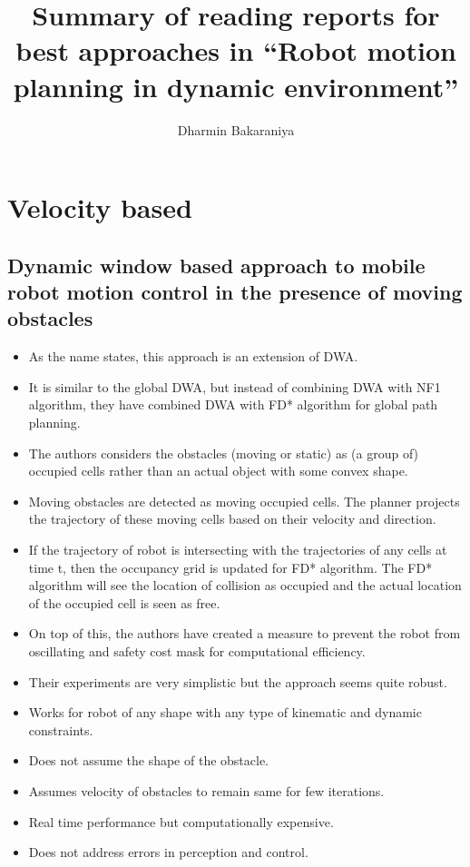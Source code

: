 \documentclass[11pt]{article}
\title{Summary of reading reports for best approaches in ``Robot motion planning in dynamic environment''}
\author{Dharmin Bakaraniya}
\begin{document}
\maketitle{}

\section{Velocity based}
\subsection{Dynamic window based approach to mobile robot motion control in the presence of moving obstacles\cite{seder2007dynamic}}
\begin{itemize}
    \item As the name states, this approach is an extension of DWA\cite{fox1997dynamic}.
    \item It is similar to the global DWA\cite{brock1999high}, but instead of combining DWA with NF1 algorithm, they have combined DWA with FD* algorithm\cite{stentz1995focused} for global path planning.
    \item The authors considers the obstacles (moving or static) as (a group of) occupied cells rather than an actual object with some convex shape.
    \item Moving obstacles are detected as moving occupied cells. The planner projects the trajectory of these moving cells based on their velocity and direction.
    \item If the trajectory of robot is intersecting with the trajectories of any cells at time t, then the occupancy grid is updated for FD* algorithm. The FD* algorithm will see the location of collision as occupied and the actual location of the occupied cell is seen as free.
    \item On top of this, the authors have created a measure to prevent the robot from oscillating and safety cost mask for computational efficiency.
    \item Their experiments are very simplistic but the approach seems quite robust.
        \color{green}
    \item Works for robot of any shape with any type of kinematic and dynamic constraints.
    \item Does not assume the shape of the obstacle.
        \color{red}
    \item Assumes velocity of obstacles to remain same for few iterations.
    \item Real time performance but computationally expensive.
    \item Does not address errors in perception and control.
\end{itemize}
\end{document}
